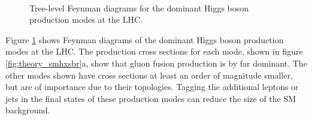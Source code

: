 \begin{figure}[h!]
\begin{center}
~\\
\end{center}
\caption[Tree-level Feynman diagrams for the dominant Higgs boson production modes at the LHC]{Tree-level Feynman diagrams for the dominant Higgs boson production modes at
the \ac{LHC}.}
\label{fig:theory_smhprod}
\end{figure}

Figure \ref{fig:theory_smhprod} shows Feynman diagrams of the dominant Higgs boson production modes
at the \ac{LHC}. The production cross sections for each mode, shown in figure
\ref{fig:theory_smhxsbr}a, show that gluon fusion production is by far dominant. The other modes
shown have cross sections at least an order of magnitude smaller, but are of importance due to their topologies.
Tagging the additional leptons or jets in the final states of
these production modes can reduce the size
of the \ac{SM} background.

